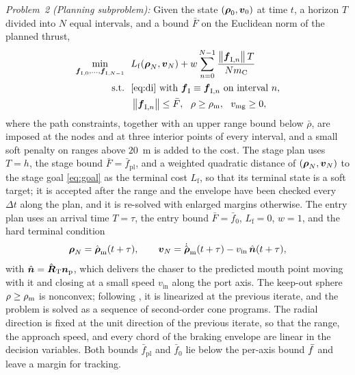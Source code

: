 \noindent\textit{Problem~2 (Planning subproblem):} Given the state $(\boldsymbol{\rho}_{0},\boldsymbol{v}_{0})$ at time $t$, a horizon $T$ divided into $N$ equal intervals, and a bound $\bar F$ on the Euclidean norm of the planned thrust,
\begin{equation}\label{eq:plan}
\begin{aligned}
\min_{\boldsymbol{f}_{\mathrm{I},0},\dots,\boldsymbol{f}_{\mathrm{I},N-1}}\ \ & L_{\mathrm{f}}(\boldsymbol{\rho}_{N},\boldsymbol{v}_{N})+w\sum_{n=0}^{N-1}\frac{\left\lVert \boldsymbol{f}_{\mathrm{I},n} \right\rVert T}{Nm_{\mathrm{C}}}\\
\text{s.t.}\ \ & \eqref{eq:di}\text{ with }\boldsymbol{f}_{\mathrm{I}}\equiv\boldsymbol{f}_{\mathrm{I},n}\text{ on interval }n,\\
& \left\lVert \boldsymbol{f}_{\mathrm{I},n} \right\rVert\le\bar F,\ \ \rho\ge\rho_{\mathrm{m}},\ \ v_{\mathrm{mg}}\ge0,
\end{aligned}
\end{equation}
where the path constraints, together with an upper range bound below $\bar\rho$, are imposed at the nodes and at three interior points of every interval, and a small soft penalty on ranges above $20$~m is added to the cost. The stage plan uses $T=h$, the stage bound $\bar F=\bar f_{\mathrm{pl}}$, and a weighted quadratic distance of $(\boldsymbol{\rho}_{N},\boldsymbol{v}_{N})$ to the stage goal \eqref{eq:goal} as the terminal cost $L_{\mathrm{f}}$, so that its terminal state is a soft target; it is accepted after the range and the envelope have been checked every $\Delta t$ along the plan, and it is re-solved with enlarged margins otherwise. The entry plan uses an arrival time $T=\tau$, the entry bound $\bar F=\bar f_{0}$, $L_{\mathrm{f}}=0$, $w=1$, and the hard terminal condition
\begin{equation}\label{eq:entryterm}
\boldsymbol{\rho}_{N}=\hat{\boldsymbol{\rho}}_{\mathrm{m}}(t+\tau),\qquad \boldsymbol{v}_{N}=\dot{\hat{\boldsymbol{\rho}}}_{\mathrm{m}}(t+\tau)-v_{\mathrm{in}}\,\hat{\boldsymbol{n}}(t+\tau),
\end{equation}
with $\hat{\boldsymbol{n}}=\hat{\boldsymbol{R}}_{\mathrm{T}}\boldsymbol{n}_{\mathrm{p}}$, which delivers the chaser to the predicted mouth point moving with it and closing at a small speed $v_{\mathrm{in}}$ along the port axis. The keep-out sphere $\rho\ge\rho_{\mathrm{m}}$ is nonconvex; following \cite{lian2026asr}, it is linearized at the previous iterate, and the problem is solved as a sequence of second-order cone programs. The radial direction is fixed at the unit direction of the previous iterate, so that the range, the approach speed, and every chord of the braking envelope are linear in the decision variables. Both bounds $\bar f_{\mathrm{pl}}$ and $\bar f_{0}$ lie below the per-axis bound $\bar f$ and leave a margin for tracking.

